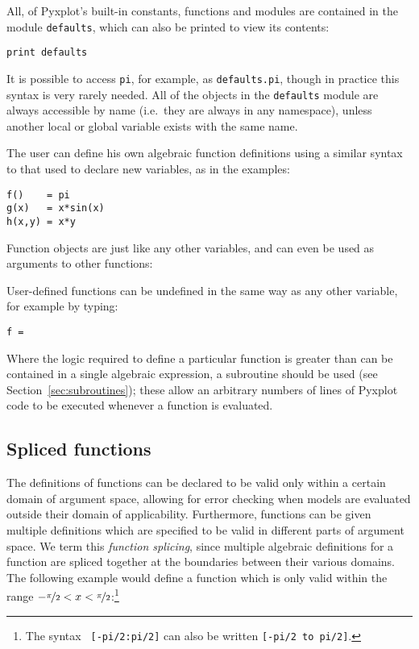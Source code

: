 \vspace{3mm}

\vspace{3mm}

All, of Pyxplot's built-in constants, functions and modules are
contained in the module {\tt defaults}, which can also be printed to view its
contents:

\begin{verbatim}
print defaults
\end{verbatim}

\noindent It is possible to access {\tt pi}, for example, as {\tt defaults.pi},
though in practice this syntax is very rarely needed. All of the objects in the
{\tt defaults} module are always accessible by name (i.e.\ they are always in
any namespace), unless another local or global variable exists with the same
name.

The user can define his own algebraic function definitions using a similar
syntax to that used to declare new variables, as in the examples:

\begin{verbatim}
f()    = pi
g(x)   = x*sin(x)
h(x,y) = x*y
\end{verbatim}

\noindent Function objects are just like any other variables, and can even be
used as arguments to other functions:

\vspace{3mm}

\vspace{3mm}

User-defined functions can be undefined in the same way as any other variable,
for example by typing:

\begin{verbatim}
f =
\end{verbatim}

Where the logic required to define a particular function is greater than can be
contained in a single algebraic expression, a subroutine should be used (see
Section~\ref{sec:subroutines}); these allow an arbitrary numbers of lines of
Pyxplot code to be executed whenever a function is evaluated.

\subsection{Spliced functions}  

The definitions of functions can be declared to be valid only within a certain
domain of argument space, allowing for error checking when models are evaluated
outside their domain of applicability. Furthermore, functions can be given
multiple definitions which are specified to be valid in different parts of
argument space. We term this {\it function splicing}, since multiple algebraic
definitions for a function are spliced together at the boundaries between
their various domains.  The following example would define a function which is
only valid within the range
$-\nicefrac{\pi}{2}<x<\nicefrac{\pi}{2}$:\footnote{The syntax {\tt
[-pi/2:pi/2]} can also be written {\tt [-pi/2 to pi/2]}.}

